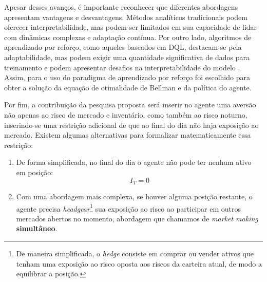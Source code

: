 Apesar desses avanços, é importante reconhecer que diferentes abordagens apresentam vantagens e desvantagens. Métodos analíticos tradicionais podem oferecer interpretabilidade, mas podem ser limitados em sua capacidade de lidar com dinâmicas complexas e adaptação contínua. Por outro lado, algoritmos de aprendizado por reforço, como aqueles baseados em DQL, destacam-se pela adaptabilidade, mas podem exigir uma quantidade significativa de dados para treinamento e podem apresentar desafios na interpretabilidade do modelo \citep{WOS:000963297000001}. Assim, para o uso do paradigma de aprendizado por reforço foi escolhido para obter a solução da equação de otimalidade de Bellman e da política do agente.

Por fim, a contribuição da pesquisa proposta será inserir no agente uma aversão não apenas ao risco de mercado e inventário, como também ao risco noturno, inserindo-se uma restrição adicional de que ao final do dia não haja exposição ao mercado. 
Existem algumas alternativas para formalizar matematicamente essa restrição:
\begin{enumerate}
    \item De forma simplificada, no final do dia o agente não pode ter nenhum ativo em posição: 
    \begin{equation}
        I_{T} = 0
        \label{eq:inventory_restriction}
    \end{equation}
    \item Com uma abordagem mais complexa, se houver alguma posição restante, o agente precisa \textit{headgear}\footnote{De maneira simplificada, o \textit{hedge} consiste em comprar ou vender ativos que tenham uma exposição ao risco oposta aos riscos da carteira atual, de modo a equilibrar a posição.} sua exposição ao risco ao participar em outros mercados abertos no momento, abordagem que chamamos de \textit{market making} \textbf{simultâneo}.
\end{enumerate}
